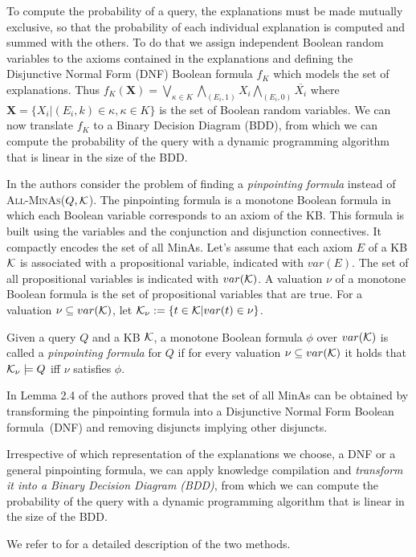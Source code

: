 To compute the probability of a query, the explanations must be made mutually exclusive, so
that the probability of each individual explanation is computed and summed
with the others. To do that we assign independent Boolean random variables to the axioms contained in the explanations and defining 
the Disjunctive Normal Form (DNF) Boolean formula $f_K$ which models the set of explanations. Thus
$
f_K(\mathbf{X})=\bigvee_{\kappa\in K}\bigwedge_{(E_i,1)}X_{i}\bigwedge_{(E_i,0)}\overline{X_{i}}
$
where $\mathbf{X}=\{X_{i}|(E_i,k)\in\kappa,\kappa\in K\}$ is the set of Boolean random variables.
We can now translate $f_K$ to a Binary Decision Diagram (BDD), from which we can compute the probability of the query with a dynamic programming algorithm that is linear in the size of the BDD.


In \cite{DBLP:journals/jar/BaaderP10,DBLP:journals/logcom/BaaderP10} the authors consider the problem of finding a \emph{pinpointing formula} instead of 
\textsc{All-MinAs($Q,{\cal K}$)}.
The pinpointing formula is a monotone Boolean formula in which each Boolean variable corresponds to an axiom of the KB. This formula is built using 
the variables and the conjunction and disjunction connectives. It compactly encodes the set of all MinAs.
Let's assume that each axiom $E$ of a KB ${\cal K}$ is associated with a propositional variable, indicated with $var(E)$. The set of all propositional variables is indicated with $var({\cal K} )$.
A valuation $\nu$ of a monotone Boolean formula is the set of propositional variables that are true. For a valuation $\nu \subseteq var({\cal K})$, let ${\cal K}_{\nu} := \{t \in {\cal K} |var(t)\in\nu\}$.
\begin{definition}
	Given a query $Q$ and a KB ${\cal K}$, a monotone Boolean formula $\phi$ over $var({\cal K})$ is called a \emph{pinpointing formula} for $Q$ if for every valuation $\nu \subseteq var({\cal K})$ it holds that ${\cal K}_{\nu} \models Q$ iff
	$\nu$ satisfies $\phi$.
	
\end{definition}
In Lemma 2.4 of \cite{DBLP:journals/logcom/BaaderP10} the authors proved that the set of all MinAs can be obtained by transforming the pinpointing formula into a Disjunctive Normal Form Boolean formula~(DNF) and removing disjuncts implying other disjuncts. 

Irrespective of which representation of the explanations we choose, a DNF or a general pinpointing formula, we can apply knowledge compilation and \textit{transform it into a Binary Decision Diagram (BDD)}, 
from which we can compute the probability of the query with a dynamic programming algorithm that is linear in the size of the BDD.

We refer to \cite{Zese17-SSW-BK,ZesBelRig16-AMAI-IJ} for a detailed description of the two methods.